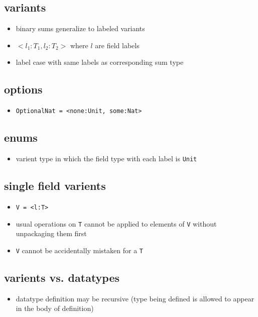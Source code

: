 \documentclass[11pt]{article}
\begin{document}
\subsection{variants}
\label{sec:orga983823}
\begin{itemize}
\item binary sums generalize to labeled variants
\item \(<l_1:T_1, l_2:T_2>\) where \(l\) are field labels
\item label case with same labels as corresponding sum type
\end{itemize}

\subsection{options}
\label{sec:org78fd89b}
\begin{itemize}
\item \texttt{OptionalNat = <none:Unit, some:Nat>}
\end{itemize}

\subsection{enums}
\label{sec:orgf9eeccf}
\begin{itemize}
\item varient type in which the field type with each label is \texttt{Unit}
\end{itemize}
\subsection{single field varients}
\label{sec:orgdf3806b}
\begin{itemize}
\item \texttt{V = <l:T>}
\item usual operations on \texttt{T} cannot be applied to elements of \texttt{V} without unpackaging them first
\item \texttt{V} cannot be accidentally mistaken for a \texttt{T}
\end{itemize}

\subsection{varients vs. datatypes}
\label{sec:orgdcb8eab}
\begin{itemize}
\item datatype definition may be recursive (type being defined is allowed to appear in the body of definition)
\end{itemize}
\end{document}
